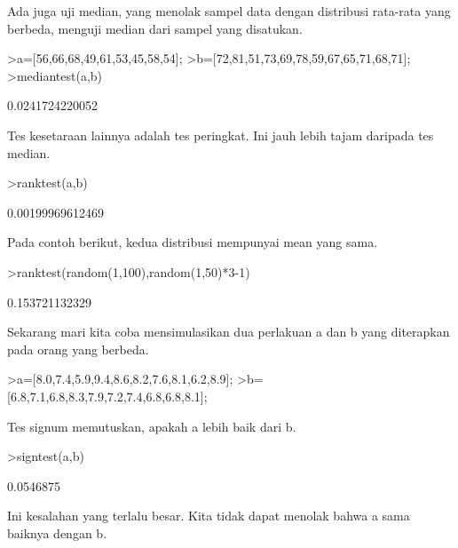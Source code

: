 \documentclass[a4paper,10pt]{article}
\begin{document}
\begin{eulernotebook}
\begin{eulercomment}
\begin{eulercomment}
\begin{eulercomment}
Ada juga uji median, yang menolak sampel data dengan distribusi
rata-rata yang berbeda, menguji median dari sampel yang disatukan.
\end{eulercomment}
\begin{eulerprompt}
>a=[56,66,68,49,61,53,45,58,54];
>b=[72,81,51,73,69,78,59,67,65,71,68,71];
>mediantest(a,b)
\end{eulerprompt}
\begin{euleroutput}
  0.0241724220052
\end{euleroutput}
\begin{eulercomment}
Tes kesetaraan lainnya adalah tes peringkat. Ini jauh lebih tajam
daripada tes median.
\end{eulercomment}
\begin{eulerprompt}
>ranktest(a,b)
\end{eulerprompt}
\begin{euleroutput}
  0.00199969612469
\end{euleroutput}
\begin{eulercomment}
Pada contoh berikut, kedua distribusi mempunyai mean yang sama.
\end{eulercomment}
\begin{eulerprompt}
>ranktest(random(1,100),random(1,50)*3-1)
\end{eulerprompt}
\begin{euleroutput}
  0.153721132329
\end{euleroutput}
\begin{eulercomment}
Sekarang mari kita coba mensimulasikan dua perlakuan a dan b yang
diterapkan pada orang yang berbeda.
\end{eulercomment}
\begin{eulerprompt}
>a=[8.0,7.4,5.9,9.4,8.6,8.2,7.6,8.1,6.2,8.9];
>b=[6.8,7.1,6.8,8.3,7.9,7.2,7.4,6.8,6.8,8.1];
\end{eulerprompt}
\begin{eulercomment}
Tes signum memutuskan, apakah a lebih baik dari b.
\end{eulercomment}
\begin{eulerprompt}
>signtest(a,b)
\end{eulerprompt}
\begin{euleroutput}
  0.0546875
\end{euleroutput}
\begin{eulercomment}
Ini kesalahan yang terlalu besar. Kita tidak dapat menolak bahwa a
sama baiknya dengan b.


\end{eulercomment}
\end{eulercomment}
\end{eulercomment}
\end{eulernotebook}
\end{document}
